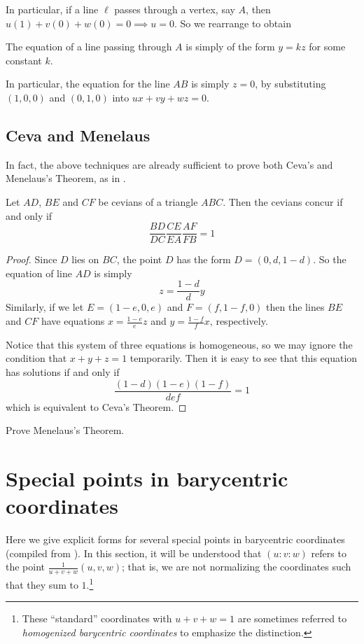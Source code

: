 In particular, if a line $\ell$ passes through a vertex, say $A$, then $u(1) + v(0) + w(0) = 0 \implies u= 0$.  So we rearrange to obtain
\begin{corollary}
  The equation of a line passing through $A$ is simply of the form $y = kz$ for some constant $k$.
\end{corollary}

In particular, the equation for the line $AB$ is simply $z=0$, by substituting $(1,0,0)$ and $(0,1,0)$ into $ux+vy+wz=0$.

\subsection{Ceva and Menelaus}
In fact, the above techniques are already sufficient to prove both Ceva's and Menelaus's Theorem, as in \cite{infinity}.
\begin{corollary}
  \label{tech:ceva}
  Let $AD$, $BE$ and $CF$ be cevians of a triangle $ABC$.  Then the cevians concur if and only if \[ \frac{BD}{DC} \frac{CE}{EA} \frac{AF}{FB} = 1\]
\end{corollary}
\begin{proof}
  Since $D$ lies on $BC$, the point $D$ has the form $D=(0,d,1-d)$.  So the equation of line $AD$  is simply \[ z = \frac{1-d}{d} y \] Similarly, if we let $E=(1-e,0,e)$ and $F=(f,1-f,0)$ then the lines $BE$ and $CF$ have equations $x = \frac{1-e}{e} z$ and $y = \frac{1-f}{f} x$, respectively.

  Notice that this system of three equations is homogeneous, so we may ignore the condition that $x+y+z=1$ temporarily.  Then it is easy to see that this equation has solutions if and only if \[ \frac{(1-d)(1-e)(1-f)}{def} = 1 \] which is equivalent to Ceva's Theorem.
\end{proof}

\begin{exercise}
  Prove Menelaus's Theorem.
\end{exercise}

\section{Special points in barycentric coordinates}
\label{sec:specialpt}
Here we give explicit forms for several special points in barycentric coordinates (compiled from \cite{infinity,wolfram,yiu}).  In this section, it will be understood that $(u:v:w)$ refers to the point $\frac{1}{u+v+w} (u,v,w)$; that is, we are not normalizing the coordinates such that they sum to $1$.\footnote{These ``standard'' coordinates with $u+v+w=1$ are sometimes referred to \textit{homogenized barycentric coordinates} to emphasize the distinction.}

